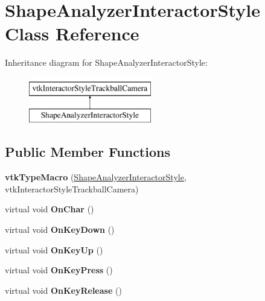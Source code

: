 \hypertarget{class_shape_analyzer_interactor_style}{}\section{Shape\+Analyzer\+Interactor\+Style Class Reference}
\label{class_shape_analyzer_interactor_style}
Inheritance diagram for Shape\+Analyzer\+Interactor\+Style\+:\begin{figure}[H]
\begin{center}
\leavevmode
\includegraphics[height=2.000000cm]{class_shape_analyzer_interactor_style}
\end{center}
\end{figure}
\subsection*{Public Member Functions}
\begin{DoxyCompactItemize}
\item 
\hypertarget{class_shape_analyzer_interactor_style_aa0735ebbc608f6d94ec4ac6bbc4dba0b}{}{\bfseries vtk\+Type\+Macro} (\hyperlink{class_shape_analyzer_interactor_style}{Shape\+Analyzer\+Interactor\+Style}, vtk\+Interactor\+Style\+Trackball\+Camera)\label{class_shape_analyzer_interactor_style_aa0735ebbc608f6d94ec4ac6bbc4dba0b}

\item 
\hypertarget{class_shape_analyzer_interactor_style_a92126b1c507a4bbc8396a507b0528f6d}{}virtual void {\bfseries On\+Char} ()\label{class_shape_analyzer_interactor_style_a92126b1c507a4bbc8396a507b0528f6d}

\item 
\hypertarget{class_shape_analyzer_interactor_style_ad927754c1768f7d1fbd168a4af19f572}{}virtual void {\bfseries On\+Key\+Down} ()\label{class_shape_analyzer_interactor_style_ad927754c1768f7d1fbd168a4af19f572}

\item 
\hypertarget{class_shape_analyzer_interactor_style_a774024564f1ef0e5b2a4e7ecbd554732}{}virtual void {\bfseries On\+Key\+Up} ()\label{class_shape_analyzer_interactor_style_a774024564f1ef0e5b2a4e7ecbd554732}

\item 
\hypertarget{class_shape_analyzer_interactor_style_a0707afa201a4d59af1b34f7e19991a35}{}virtual void {\bfseries On\+Key\+Press} ()\label{class_shape_analyzer_interactor_style_a0707afa201a4d59af1b34f7e19991a35}

\item 
\hypertarget{class_shape_analyzer_interactor_style_a97c67f7499796f59b8f77ac4908c4560}{}virtual void {\bfseries On\+Key\+Release} ()\label{class_shape_analyzer_interactor_style_a97c67f7499796f59b8f77ac4908c4560}

\end{DoxyCompactItemize}

